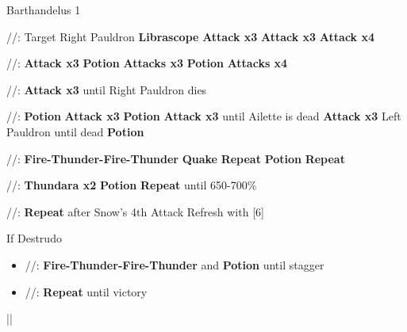 \begin{fight}{Barthandelus 1}
	\item [1] \com/\syn/\com: Target Right Pauldron \to \textbf{Librascope} \to \textbf{Attack x3} \to \textbf{Attack x3} \to \textbf{Attack x4}
	\item [6] \com/\com/\com: \textbf{Attack x3} \to \textbf{Potion} \to \textbf{Attacks x3} \to \textbf{Potion} \to \textbf{Attacks x4}
	\item [5] \com/\com/\com: \textbf{Attack x3} until Right Pauldron dies
	\item [1] \com/\syn/\com: \textbf{Potion} \to \textbf{Attack x3} \to \textbf{Potion} \to \textbf{Attack x3} until Ailette is dead \to \textbf{Attack x3} Left Pauldron until dead \to \textbf{Potion}
	\item [2] \rav/\rav/\rav: \textbf{Fire-Thunder-Fire-Thunder} \to \textbf{Quake} \to \textbf{Repeat} \to \textbf{Potion} \to \textbf{Repeat}
	\item [4] \rav/\rav/\rav: \textbf{Thundara x2} \to \textbf{Potion} \to \textbf{Repeat} until 650-700\%
	\item [5] \com/\com/\com: \textbf{Repeat} after Snow's 4th Attack \to Refresh with [6]
	\item If Destrudo
	\begin{itemize}
		\item [4] \rav/\rav/\rav: \textbf{Fire-Thunder-Fire-Thunder} and \textbf{Potion} until stagger
		\item [5] \com/\com/\com: \textbf{Repeat} until victory
	\end{itemize}
	\item ||\save
\end{fight}
